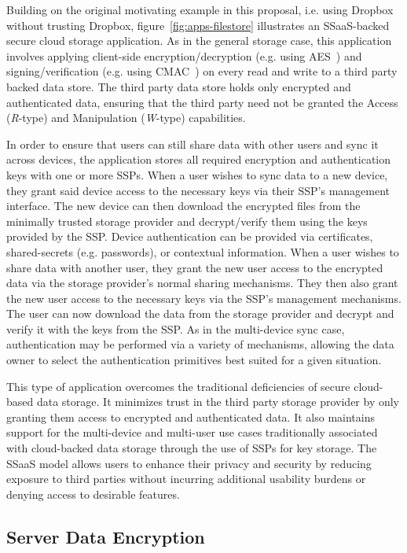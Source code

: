Building on the original motivating example in this proposal,
i.e. using Dropbox without trusting Dropbox,
figure~\ref{fig:apps-filestore} illustrates an SSaaS-backed secure
cloud storage application. As in the general storage case, this
application involves applying client-side encryption/decryption
(e.g. using AES~\cite{nist2001}) and signing/verification (e.g. using
CMAC~\cite{dworkin2005}) on every read and write to a third party
backed data store. The third party data store holds only encrypted and
authenticated data, ensuring that the third party need not be granted
the Access (\emph{R}-type) and Manipulation (\emph{W}-type)
capabilities.

In order to ensure that users can still share data with other users
and sync it across devices, the application stores all required
encryption and authentication keys with one or more SSPs. When a user
wishes to sync data to a new device, they grant said device access to
the necessary keys via their SSP's management interface. The new
device can then download the encrypted files from the minimally
trusted storage provider and decrypt/verify them using the keys
provided by the SSP. Device authentication can be provided via
certificates, shared-secrets (e.g. passwords), or contextual
information. When a user wishes to share data with another user, they
grant the new user access to the encrypted data via the storage
provider's normal sharing mechanisms. They then also grant the new
user access to the necessary keys via the SSP's management
mechanisms. The user can now download the data from the storage
provider and decrypt and verify it with the keys from the SSP. As in
the multi-device sync case, authentication may be performed via a
variety of mechanisms, allowing the data owner to select the
authentication primitives best suited for a given situation.

This type of application overcomes the traditional deficiencies of
secure cloud-based data storage. It minimizes trust in the third party
storage provider by only granting them access to encrypted and
authenticated data. It also maintains support for the multi-device and
multi-user use cases traditionally associated with cloud-backed data
storage through the use of SSPs for key storage. The SSaaS model
allows users to enhance their privacy and security by reducing
exposure to third parties without incurring additional usability
burdens or denying access to desirable features.

\subsection{Server Data Encryption}

